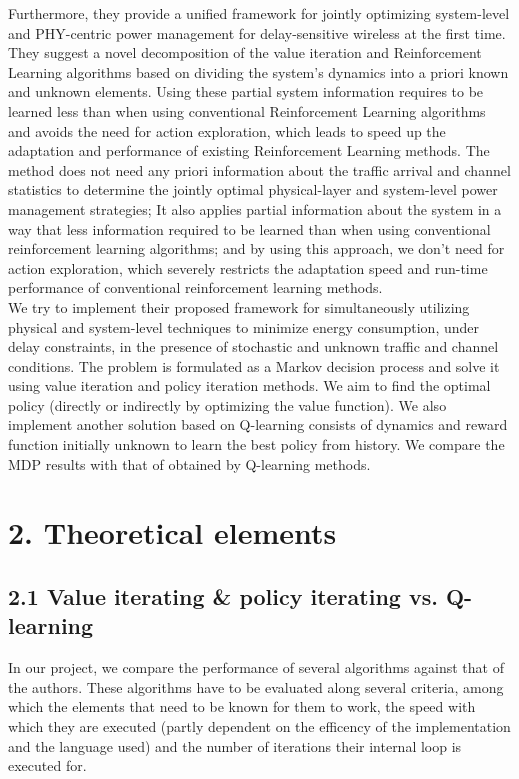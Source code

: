 \documentclass[a4paper, 12pt]{report}
\begin{document}
Furthermore, they provide a unified framework for jointly optimizing system-level and PHY-centric power management for delay-sensitive wireless at the first time.
They suggest a novel decomposition of the value iteration and Reinforcement Learning algorithms based on dividing the system’s dynamics into a priori known and unknown elements. Using these partial system information requires to be learned less than when using conventional Reinforcement Learning algorithms and avoids the need for action exploration, which leads to speed up the adaptation and performance of existing Reinforcement Learning methods. 
The method does not need any priori information about the traffic arrival and channel statistics
to determine the jointly optimal physical-layer and system-level power management strategies; 
It also applies partial information about the system in a way that less information required to be learned than when using conventional reinforcement learning algorithms; and by using this approach, we don't need for action exploration, which severely restricts the adaptation speed and run-time performance of conventional reinforcement learning methods.
\\ 
We try to implement their proposed framework for simultaneously utilizing physical and system-level techniques to minimize energy consumption, under delay constraints, in the presence of stochastic and unknown traffic and channel conditions. 
The problem is formulated as a Markov decision process and solve it using value iteration and policy iteration methods. We aim to find the optimal policy (directly or indirectly by optimizing the
value function). We also implement another solution based on Q-learning consists of dynamics and reward function initially unknown to learn the best policy from history.
We compare the MDP results with that of obtained by Q-learning methods.

\chapter*{2. Theoretical elements}

\section*{2.1 Value iterating \& policy iterating vs. Q-learning}

In our project, we compare the performance of several algorithms against that of the authors.
These algorithms have to be evaluated along several criteria, among which the elements that need to be known
for them to work, the speed with which they are executed (partly dependent on the efficency of the implementation and the language used)
and the number of iterations their internal loop is executed for.
\end{document}
